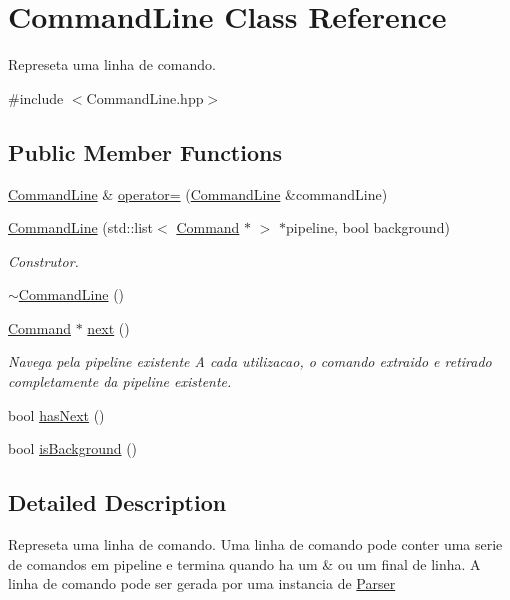 \hypertarget{classCommandLine}{
\section{CommandLine Class Reference}
\label{classCommandLine}
}


Represeta uma linha de comando.  




{\ttfamily \#include $<$CommandLine.hpp$>$}

\subsection*{Public Member Functions}
\begin{DoxyCompactItemize}
\item 
\hyperlink{classCommandLine}{CommandLine} \& \hyperlink{classCommandLine_a6afe6535f161927c0f658c51b9b63387}{operator=} (\hyperlink{classCommandLine}{CommandLine} \&commandLine)
\item 
\hyperlink{classCommandLine_a5c92f3c1c27926725eba68012f94d037}{CommandLine} (std::list$<$ \hyperlink{classCommand}{Command} $\ast$ $>$ $\ast$pipeline, bool background)
\begin{DoxyCompactList}\small\item\em Construtor. \item\end{DoxyCompactList}\item 
\hyperlink{classCommandLine_ac359efccafe57f845b1f747a9db3c6d9}{$\sim$CommandLine} ()
\item 
\hyperlink{classCommand}{Command} $\ast$ \hyperlink{classCommandLine_a34c3031124c1716e37170c5e60b487b2}{next} ()
\begin{DoxyCompactList}\small\item\em Navega pela pipeline existente A cada utilizacao, o comando extraido e retirado completamente da pipeline existente. \item\end{DoxyCompactList}\item 
bool \hyperlink{classCommandLine_a1994cb40c62ba84af078662842009a0b}{hasNext} ()
\item 
bool \hyperlink{classCommandLine_a4dfa18cb1625e1d25c6e5e68bbbc712e}{isBackground} ()
\end{DoxyCompactItemize}


\subsection{Detailed Description}
Represeta uma linha de comando. Uma linha de comando pode conter uma serie de comandos em pipeline e termina quando ha um \& ou um final de linha. A linha de comando pode ser gerada por uma instancia de \hyperlink{classParser}{Parser}

